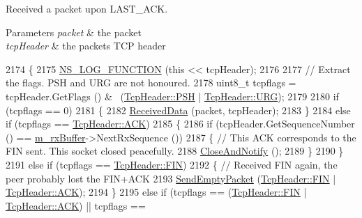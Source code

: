 Received a packet upon L\+A\+S\+T\+\_\+\+A\+CK. 


\begin{DoxyParams}{Parameters}
{\em packet} & the packet \\
\hline
{\em tcp\+Header} & the packet\textquotesingle{}s T\+CP header \\
\hline
\end{DoxyParams}

\begin{DoxyCode}
2174 \{
2175   \hyperlink{log-macros-disabled_8h_a90b90d5bad1f39cb1b64923ea94c0761}{NS\_LOG\_FUNCTION} (\textcolor{keyword}{this} << tcpHeader);
2176 
2177   \textcolor{comment}{// Extract the flags. PSH and URG are not honoured.}
2178   uint8\_t tcpflags = tcpHeader.GetFlags () & ~(\hyperlink{classns3_1_1TcpHeader_a5f3d432941327854b5ad621e467479c6a3f1e9f1fc7466d436279cfe7ab9ef3db}{TcpHeader::PSH} | 
      \hyperlink{classns3_1_1TcpHeader_a5f3d432941327854b5ad621e467479c6a03d58c80bf87169baf9f2f4896b7cf65}{TcpHeader::URG});
2179 
2180   \textcolor{keywordflow}{if} (tcpflags == 0)
2181     \{
2182       \hyperlink{classns3_1_1TcpSocketBase_a479e1a8be1ee1b169f87e57a4dc6f73c}{ReceivedData} (packet, tcpHeader);
2183     \}
2184   \textcolor{keywordflow}{else} \textcolor{keywordflow}{if} (tcpflags == \hyperlink{classns3_1_1TcpHeader_a5f3d432941327854b5ad621e467479c6a1182e63050402c9f49208c62c1ec2d5c}{TcpHeader::ACK})
2185     \{
2186       \textcolor{keywordflow}{if} (tcpHeader.GetSequenceNumber () == \hyperlink{classns3_1_1TcpSocketBase_a0163894148e5a70e6bd89970a1483fae}{m\_rxBuffer}->NextRxSequence ())
2187         \{ \textcolor{comment}{// This ACK corresponds to the FIN sent. This socket closed peacefully.}
2188           \hyperlink{classns3_1_1TcpSocketBase_a04354f05482d826576740fd2f1691818}{CloseAndNotify} ();
2189         \}
2190     \}
2191   \textcolor{keywordflow}{else} \textcolor{keywordflow}{if} (tcpflags == \hyperlink{classns3_1_1TcpHeader_a5f3d432941327854b5ad621e467479c6ad523ac42b96f79a086261246e83b5244}{TcpHeader::FIN})
2192     \{ \textcolor{comment}{// Received FIN again, the peer probably lost the FIN+ACK}
2193       \hyperlink{classns3_1_1TcpSocketBase_aa858913c9a4480a14d293f1014905b3e}{SendEmptyPacket} (\hyperlink{classns3_1_1TcpHeader_a5f3d432941327854b5ad621e467479c6ad523ac42b96f79a086261246e83b5244}{TcpHeader::FIN} | 
      \hyperlink{classns3_1_1TcpHeader_a5f3d432941327854b5ad621e467479c6a1182e63050402c9f49208c62c1ec2d5c}{TcpHeader::ACK});
2194     \}
2195   \textcolor{keywordflow}{else} \textcolor{keywordflow}{if} (tcpflags == (\hyperlink{classns3_1_1TcpHeader_a5f3d432941327854b5ad621e467479c6ad523ac42b96f79a086261246e83b5244}{TcpHeader::FIN} | \hyperlink{classns3_1_1TcpHeader_a5f3d432941327854b5ad621e467479c6a1182e63050402c9f49208c62c1ec2d5c}{TcpHeader::ACK}) || tcpflags == 

\end{DoxyCode}
